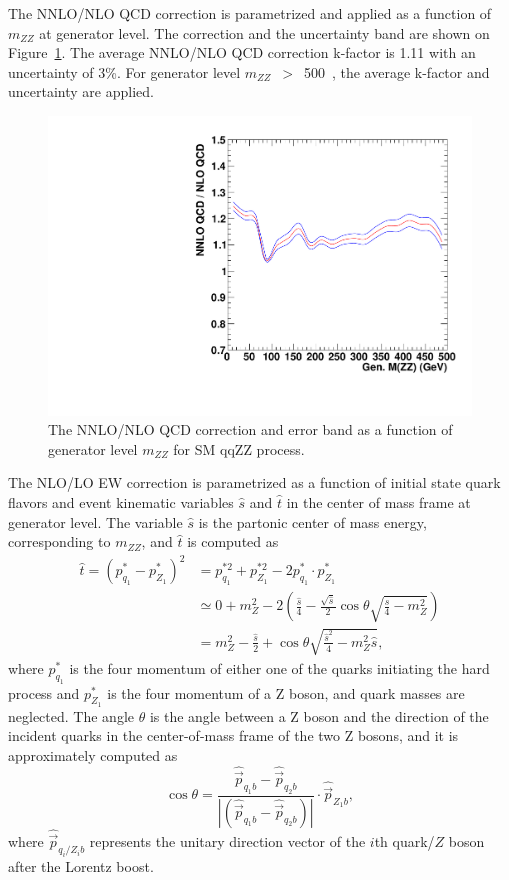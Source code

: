 \vspace{0.3cm}
The NNLO/NLO QCD correction is parametrized and applied as a function of $m_{ZZ}$ 
at generator level. 
The correction and the uncertainty band are shown on Figure~\ref{fig:qqzz_nnlo_qcd}.
The average NNLO/NLO QCD correction k-factor is 1.11 with an uncertainty of 3\%.
For generator level $m_{ZZ}$~$>$~500~\GeV, the average k-factor and uncertainty are applied. 

\begin{figure}[htbp!]
\centering
  \includegraphics[width=0.48\linewidth]{figures/h_nnlo_to_nlo_vs_mzz.pdf}
  \caption{The NNLO/NLO QCD correction and error band as a function of generator level $m_{ZZ}$ for SM qqZZ process.}
  \label{fig:qqzz_nnlo_qcd}
\end{figure}

\vspace{0.3cm}
The NLO/LO EW correction is parametrized as a function of initial state quark flavors and event kinematic variables $\hat{s}$ and $\hat{t}$
in the center of mass frame at generator level. 
The variable $\hat{s}$ is the partonic center of mass energy, corresponding to $m_{ZZ}$,
and $\hat{t}$ is computed as
\begin{align*}
\hat{t} = \left(p^*_{q_1}-p^*_{Z_1}\right)^2 & = p_{q_1}^{*2} +
p_{Z_1}^{*2} - 2 p^*_{q_1} \cdot p^*_{Z_1} \\
& \simeq 0 + m_{Z}^{2} - 2 \left( \frac{\hat{s}}{4} -
\frac{\sqrt{\hat{s}}}{2} \cos{\theta} \sqrt{\frac{\hat{s}}{4} -
m_{Z}^{2}} \right) \\
& = m_{Z}^{2} - \frac{\hat{s}}{2} + \cos{\theta}
\sqrt{\frac{\hat{s}^2}{4} - m_{Z}^{2}\hat{s}},
\end{align*}
where $p^*_{q_1}$ is the four momentum of either one of the quarks initiating the hard process and 
$p^*_{Z_1}$  is the four momentum of a Z boson, and quark masses are neglected.
The angle $\theta$ is the angle between a Z boson and the direction of the
incident quarks in the center-of-mass frame of the two Z bosons, and it is approximately computed as 
\begin{equation*}
\cos{\theta} = \frac{\hat{\vec{p}}_{q_1b} -
\hat{\vec{p}}_{q_2b}}{\left|\left( \hat{\vec{p}}_{q_1b} -
\hat{\vec{p}}_{q_2b} \right)\right|} \cdot \hat{\vec{p}}_{Z_1b},
\end{equation*}
where $\hat{\vec{p}}_{q_i/Z_ib}$ represents the unitary direction vector of the
$i$th quark/$Z$ boson after the Lorentz boost. 

